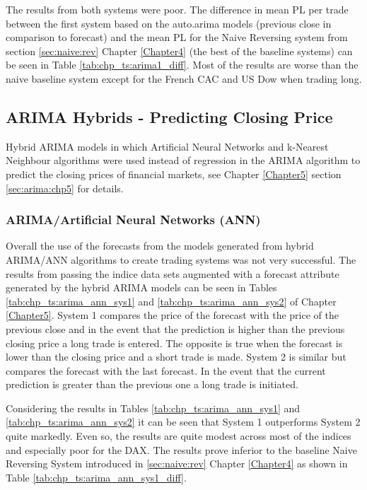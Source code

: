 The results from both systems were poor. The difference in mean PL per trade between the first system based on the auto.arima models (previous close in comparison to forecast) and the mean PL for the Naive Reversing system from section \ref{sec:naive:rev} Chapter \ref{Chapter4} (the best of the baseline systems) can be seen in Table \ref{tab:chp_ts:arima1_diff}. Most of the results are worse than the naive baseline system except for the French CAC and US Dow when trading long.



\subsection{ARIMA Hybrids - Predicting Closing Price}
Hybrid ARIMA models in which Artificial Neural Networks and k-Nearest Neighbour algorithms were used instead of regression in the ARIMA algorithm to predict the closing prices of financial markets, see Chapter \ref{Chapter5} section \ref{sec:arima:chp5} for details.

\subsubsection{ARIMA/Artificial Neural Networks (ANN)}
Overall the use of the forecasts from the models generated from hybrid ARIMA/ANN algorithms to create trading systems was not very successful. The results from passing the indice data sets augmented with a forecast attribute generated by the hybrid ARIMA models can be seen in Tables  \ref{tab:chp_ts:arima_ann_sys1} and \ref{tab:chp_ts:arima_ann_sys2} of Chapter \ref{Chapter5}. System 1 compares the price of the forecast with the price of the previous close and in the event that the prediction is higher than the previous closing price a long trade is entered. The opposite is true when the forecast is lower than the closing price and a short trade is made. System 2 is similar but compares the forecast with the last forecast. In the event that the current prediction is greater than the previous one a long trade is initiated.

Considering the results in Tables \ref{tab:chp_ts:arima_ann_sys1} and \ref{tab:chp_ts:arima_ann_sys2} it can be seen that System 1 outperforms System 2 quite markedly. Even so, the results are quite modest across most of the indices and especially poor for the DAX. The results prove inferior to the baseline Naive Reversing System introduced in \ref{sec:naive:rev} Chapter \ref{Chapter4} as shown in Table \ref{tab:chp_ts:arima_ann_sys1_diff}.

